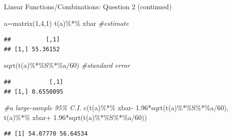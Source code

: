 \documentclass[
  ignorenonframetext,
]{beamer}
\newenvironment{Shaded}{\begin{snugshade}}{\end{snugshade}}
\newcommand{\CommentTok}[1]{\textcolor[rgb]{0.56,0.35,0.01}{\textit{#1}}}
\newcommand{\DecValTok}[1]{\textcolor[rgb]{0.00,0.00,0.81}{#1}}
\newcommand{\FloatTok}[1]{\textcolor[rgb]{0.00,0.00,0.81}{#1}}
\newcommand{\FunctionTok}[1]{\textcolor[rgb]{0.00,0.00,0.00}{#1}}
\newcommand{\NormalTok}[1]{#1}
\newcommand{\OtherTok}[1]{\textcolor[rgb]{0.56,0.35,0.01}{#1}}
\newcommand{\SpecialCharTok}[1]{\textcolor[rgb]{0.00,0.00,0.00}{#1}}
\begin{document}
\begin{frame}[fragile]{Linear Functions/Combinations: Question 2
(continued)}
\protect\hypertarget{linear-functionscombinations-question-2-continued}{}
\begin{Shaded}
\begin{Highlighting}[]
\NormalTok{a}\OtherTok{=}\FunctionTok{matrix}\NormalTok{(}\DecValTok{1}\NormalTok{,}\DecValTok{4}\NormalTok{,}\DecValTok{1}\NormalTok{)}
\FunctionTok{t}\NormalTok{(a)}\SpecialCharTok{\%*\%}\NormalTok{ xbar }\CommentTok{\#estimate }
\end{Highlighting}
\end{Shaded}

\begin{verbatim}
##          [,1]
## [1,] 55.36152
\end{verbatim}

\begin{Shaded}
\begin{Highlighting}[]
\FunctionTok{sqrt}\NormalTok{(}\FunctionTok{t}\NormalTok{(a)}\SpecialCharTok{\%*\%}\NormalTok{S}\SpecialCharTok{\%*\%}\NormalTok{a}\SpecialCharTok{/}\DecValTok{60}\NormalTok{) }\CommentTok{\#standard error}
\end{Highlighting}
\end{Shaded}

\begin{verbatim}
##           [,1]
## [1,] 0.6550095
\end{verbatim}

\begin{Shaded}
\begin{Highlighting}[]
\CommentTok{\#a large{-}sample 95\% C.I. }
\FunctionTok{c}\NormalTok{(}\FunctionTok{t}\NormalTok{(a)}\SpecialCharTok{\%*\%}\NormalTok{ xbar}\SpecialCharTok{{-}} \FloatTok{1.96}\SpecialCharTok{*}\FunctionTok{sqrt}\NormalTok{(}\FunctionTok{t}\NormalTok{(a)}\SpecialCharTok{\%*\%}\NormalTok{S}\SpecialCharTok{\%*\%}\NormalTok{a}\SpecialCharTok{/}\DecValTok{60}\NormalTok{), }
  \FunctionTok{t}\NormalTok{(a)}\SpecialCharTok{\%*\%}\NormalTok{ xbar}\SpecialCharTok{+} \FloatTok{1.96}\SpecialCharTok{*}\FunctionTok{sqrt}\NormalTok{(}\FunctionTok{t}\NormalTok{(a)}\SpecialCharTok{\%*\%}\NormalTok{S}\SpecialCharTok{\%*\%}\NormalTok{a}\SpecialCharTok{/}\DecValTok{60}\NormalTok{))}
\end{Highlighting}
\end{Shaded}

\begin{verbatim}
## [1] 54.07770 56.64534
\end{verbatim}
\end{frame}
\end{document}
